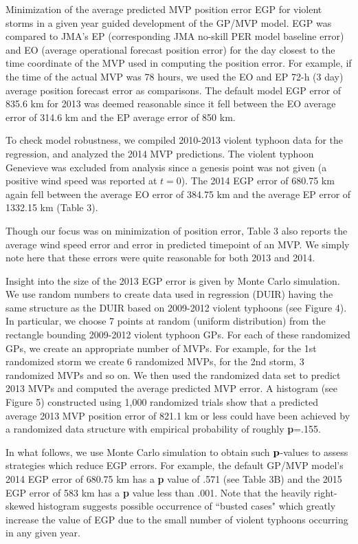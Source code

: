 \documentclass[a4paper, 12pt]{article}
\begin{document}
{


         Minimization of the average predicted MVP position error EGP for violent storms in a given year guided development of the GP/MVP model.  EGP was compared to JMA's EP (corresponding JMA no-skill PER model baseline error) and EO (average operational forecast position error) for the day closest to the time coordinate of the MVP used in computing the position error. For example, if the time of the actual MVP was 78 hours, we used the EO and EP 72-h (3 day) average position forecast error as comparisons. The default model EGP error of 835.6 km for 2013 was deemed reasonable since it fell between the EO average error of 314.6 km and the EP average error of 850 km.

          To check model robustness, we compiled 2010-2013 violent typhoon data for the regression, and analyzed the
           2014 MVP predictions.  The violent typhoon Genevieve was excluded from analysis since a genesis point was not given (a positive wind speed was reported at $t=0$).  The 2014 EGP error of 680.75 km again fell between the average EO error of 384.75 km and the average EP error of 1332.15 km (Table 3).

     Though our focus was on minimization of position error, Table 3 also reports the average wind speed error and error in predicted timepoint of an MVP. We simply note here that these errors were quite reasonable for both 2013 and 2014.

     Insight into the size of the 2013 EGP error is given by Monte Carlo simulation.  We use random numbers to create data used in regression (DUIR) having the same structure as the DUIR based on 2009-2012 violent typhoons (see Figure 4).  In particular, we choose 7 points at random (uniform distribution) from the rectangle bounding 2009-2012 violent typhoon GPs.  For each of these randomized GPs, we create an appropriate number of MVPs.  For example, for the 1st randomized storm we create 6 randomized MVPs, for the 2nd storm, 3 randomized MVPs and so on.      We then used the randomized data set to predict 2013 MVPs and computed the average predicted MVP error. A histogram (see Figure 5) constructed using 1,000 randomized trials show that a predicted average 2013 MVP position error of 821.1 km or less could have been achieved by a randomized data structure with empirical probability of roughly {\bf p}=.155.


        In what follows, we use Monte Carlo simulation to obtain such ${\bf p}$-values to assess strategies which reduce EGP errors. For example, the default GP/MVP model's 2014 EGP error of 680.75 km has a {\bf p} value of .571 (see Table 3B) and the 2015 EGP error of 583 km has a {\bf p} value less than .001.  Note that the heavily right-skewed histogram suggests possible occurrence of  ``busted cases" which greatly increase the value of EGP due to the small number of violent typhoons occurring in any given year.

}
\end{document}
